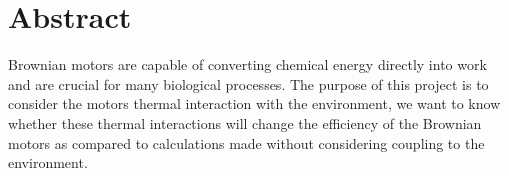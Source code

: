 \documentclass[
10pt, %
a4paper, %
oneside, %
headinclude,footinclude, %
BCOR5mm, %
]{scrartcl}
\title{\normalfont\spacedallcaps{Self induced temperatures in Brownian motors}} %
\author{\spacedlowsmallcaps{Jack Devine}} %
\date{\today} %
\begin{document}




\maketitle %


\tableofcontents %




\section*{Abstract} %

Brownian motors are capable of converting chemical energy directly into work and are crucial for many biological processes. The purpose of this project is to consider the motors thermal interaction with  the environment, we want to know whether these thermal interactions will change the efficiency of the Brownian motors as compared to calculations made without considering coupling to the environment.
\end{document}
